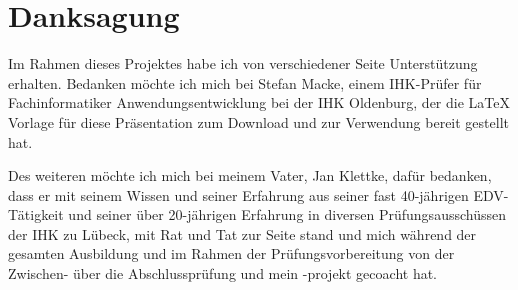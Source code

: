 \cleardoublepage

\section{Danksagung}
\label{sec:Danksagung}
Im Rahmen dieses Projektes habe ich von verschiedener Seite Unterstützung erhalten. Bedanken möchte ich mich bei Stefan Macke, einem IHK-Prüfer für Fachinformatiker Anwendungsentwicklung bei der IHK Oldenburg, der die LaTeX Vorlage für diese Präsentation zum Download und zur Verwendung bereit gestellt hat.

Des weiteren möchte ich mich bei meinem Vater, Jan Klettke, dafür bedanken, dass er mit seinem Wissen und seiner Erfahrung aus seiner fast 40-jährigen EDV-Tätigkeit und seiner über 20-jährigen Erfahrung in diversen Prüfungsausschüssen der IHK zu Lübeck, mit Rat und Tat zur Seite stand und mich während der gesamten Ausbildung und im Rahmen der Prüfungsvorbereitung von der Zwischen- über die Abschlussprüfung und mein -projekt gecoacht hat.
